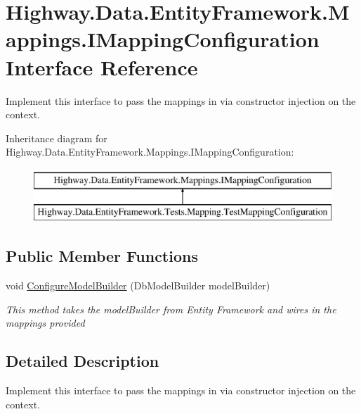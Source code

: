 \hypertarget{interface_highway_1_1_data_1_1_entity_framework_1_1_mappings_1_1_i_mapping_configuration}{\section{Highway.\-Data.\-Entity\-Framework.\-Mappings.\-I\-Mapping\-Configuration Interface Reference}
\label{interface_highway_1_1_data_1_1_entity_framework_1_1_mappings_1_1_i_mapping_configuration}
}


Implement this interface to pass the mappings in via constructor injection on the context.  


Inheritance diagram for Highway.\-Data.\-Entity\-Framework.\-Mappings.\-I\-Mapping\-Configuration\-:\begin{figure}[H]
\begin{center}
\leavevmode
\includegraphics[height=2.000000cm]{interface_highway_1_1_data_1_1_entity_framework_1_1_mappings_1_1_i_mapping_configuration}
\end{center}
\end{figure}
\subsection*{Public Member Functions}
\begin{DoxyCompactItemize}
\item 
void \hyperlink{interface_highway_1_1_data_1_1_entity_framework_1_1_mappings_1_1_i_mapping_configuration_a84ae8af129375228ed45a1538cceb06e}{Configure\-Model\-Builder} (Db\-Model\-Builder model\-Builder)
\begin{DoxyCompactList}\small\item\em This method takes the model\-Builder from Entity Framework and wires in the mappings provided \end{DoxyCompactList}\end{DoxyCompactItemize}


\subsection{Detailed Description}
Implement this interface to pass the mappings in via constructor injection on the context. 



